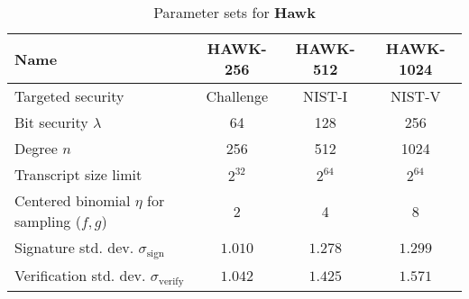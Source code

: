 \begin{table}[h]
    \centering
    \caption{Parameter sets for \textbf{Hawk}}
    \label{tab:hawk-parameters}
    \begin{tabular}{lccc}
        \toprule
        \textbf{Name} & \textbf{HAWK-256} & \textbf{HAWK-512} & \textbf{HAWK-1024} \\
        \midrule
        \multicolumn{1}{l}{Targeted security} & Challenge & NIST-I & NIST-V \\
        Bit security $\lambda$ & 64 & 128 & 256 \\
        \midrule
        Degree $n$ & 256 & 512 & 1024 \\ 
        Transcript size limit & $2^{32}$ & $2^{64}$ & $2^{64}$ \\ 
        Centered binomial $\eta$ for sampling ($f, g$) & 2 & 4 & 8 \\
        Signature std. dev. $\sigma_{\text{sign}}$ & $1.010$ & $1.278$ & $1.299$ \\
        Verification std. dev. $\sigma_{\text{verify}}$ & $1.042$ & $1.425$ & $1.571$ \\
        \bottomrule
    \end{tabular}
\end{table}

